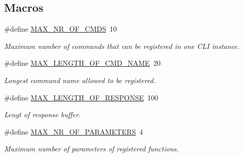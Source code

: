\subsection*{Macros}
\begin{DoxyCompactItemize}
\item 
\hypertarget{group___s_i_m_p_l_e___c_l_i_gac5c0c1eca89291c3464b4ff294b13f05}{\#define \hyperlink{group___s_i_m_p_l_e___c_l_i_gac5c0c1eca89291c3464b4ff294b13f05}{M\+A\+X\+\_\+\+N\+R\+\_\+\+O\+F\+\_\+\+C\+M\+D\+S}~10}\label{group___s_i_m_p_l_e___c_l_i_gac5c0c1eca89291c3464b4ff294b13f05}

\begin{DoxyCompactList}\small\item\em Maximum number of commands that can be registered in one C\+L\+I instance. \end{DoxyCompactList}\item 
\hypertarget{group___s_i_m_p_l_e___c_l_i_gabd0278272d66be331cab5531626c475d}{\#define \hyperlink{group___s_i_m_p_l_e___c_l_i_gabd0278272d66be331cab5531626c475d}{M\+A\+X\+\_\+\+L\+E\+N\+G\+T\+H\+\_\+\+O\+F\+\_\+\+C\+M\+D\+\_\+\+N\+A\+M\+E}~20}\label{group___s_i_m_p_l_e___c_l_i_gabd0278272d66be331cab5531626c475d}

\begin{DoxyCompactList}\small\item\em Longest command name allowed to be registered. \end{DoxyCompactList}\item 
\hypertarget{group___s_i_m_p_l_e___c_l_i_ga17e61582091ee023dd2d011f13e8f971}{\#define \hyperlink{group___s_i_m_p_l_e___c_l_i_ga17e61582091ee023dd2d011f13e8f971}{M\+A\+X\+\_\+\+L\+E\+N\+G\+T\+H\+\_\+\+O\+F\+\_\+\+R\+E\+S\+P\+O\+N\+S\+E}~100}\label{group___s_i_m_p_l_e___c_l_i_ga17e61582091ee023dd2d011f13e8f971}

\begin{DoxyCompactList}\small\item\em Lengt of response buffer. \end{DoxyCompactList}\item 
\hypertarget{group___s_i_m_p_l_e___c_l_i_gad8bacdd29d97762d63a242cba6444b32}{\#define \hyperlink{group___s_i_m_p_l_e___c_l_i_gad8bacdd29d97762d63a242cba6444b32}{M\+A\+X\+\_\+\+N\+R\+\_\+\+O\+F\+\_\+\+P\+A\+R\+A\+M\+E\+T\+E\+R\+S}~4}\label{group___s_i_m_p_l_e___c_l_i_gad8bacdd29d97762d63a242cba6444b32}

\begin{DoxyCompactList}\small\item\em Maximum number of parameters of registered functions. \end{DoxyCompactList}\end{DoxyCompactItemize}
